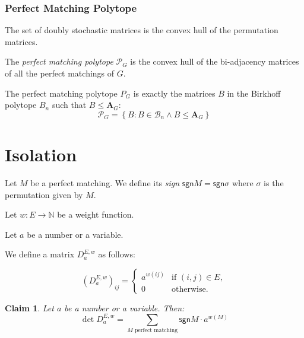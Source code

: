 \documentclass{beamer}
\newtheorem{claim}{Claim}
\theoremstyle{remark}
\newcommand{\nn}{\mathbb{N}}
\newcommand{\birk}{\mathcal{B}}
\newcommand{\biadj}[1]{\mathbf{A}_{#1}}
\newcommand{\pmatch}{\mathcal{P}}
\newcommand{\setcomp}[1]{\left\{#1\right\}}
\newcommand{\sgn}{\mathsf{sgn}}
\begin{document}
\begin{frame}
  \frametitle{Perfect Matching Polytope}
  \begin{theorem}[Birkhoff, 1946]
    The set of doubly stochastic matrices is the convex hull of the
    permutation matrices.
  \end{theorem}

  \begin{definition}
    The \emph{perfect matching polytope} $\pmatch_G$ is the convex hull of
    the bi-adjacency matrices of all the perfect matchings of $G$.
  \end{definition}

  \begin{corollary}
    The perfect matching polytope $P_G$ is exactly the matrices $B$ in
    the Birkhoff polytope $B_n$ such that $B \le \biadj{G}$:
    \[
      \pmatch_G = \setcomp{B : B \in \birk_n \wedge B \le \biadj{G}}
    \]
  \end{corollary}
\end{frame}

\section{Isolation}
\begin{frame}
  \begin{definition}
    Let $M$ be a perfect matching.
    We define its \emph{sign} $\sgn M = \sgn \sigma$ where $\sigma$
    is the permutation given by $M$.
  \end{definition}
  \begin{definition}
    Let $w : E \to \nn$ be a weight function.

    Let $a$ be a number or a variable.

    We define a matrix $D_a^{E,w}$ as follows:

    \[
      {\left(D_a^{E,w}\right)}_{ij} =
      \begin{cases}
        a^{w(ij)} & \text{if } (i, j) \in E, \\
        0         & \text{otherwise}.
      \end{cases}
    \]
  \end{definition}

  \begin{claim}
    Let $a$ be a number or a variable. Then:
    \[
      \det D_a^{E,w} = \sum_{M \text{ perfect matching}} \sgn M \cdot a^{w(M)}
    \]
  \end{claim}
\end{frame}
\end{document}

